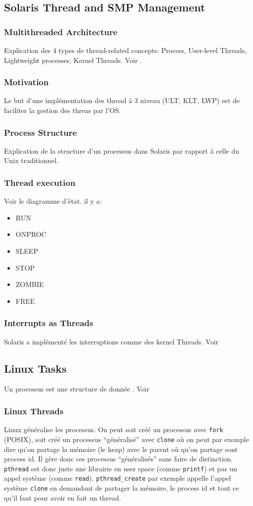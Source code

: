 \subsection{Solaris Thread and SMP Management }
\subsubsection{Multithreaded Architecture}
Explication des 4 types de thread-related concepts: Process, User-level Threads, Lightweight processes, Kernel Threads.
Voir \cite[p.~202]{stallings}.
\subsubsection{Motivation}
Le but d'une implémentation des thread à 3 niveau (ULT, KLT, LWP) est de faciliter la gestion des threas par l'OS.
\subsubsection{Process Structure}
Explication de la structure d'un processus dans Solaris par rapport à celle du Unix traditionnel.
\subsubsection{Thread execution}
Voir le diagramme d'état.
il y a:
\begin{itemize}
  \item RUN
  \item ONPROC
  \item SLEEP
  \item STOP
  \item ZOMBIE
  \item FREE
\end{itemize}
\subsubsection{Interrupts as Threads}
Solaris a implémenté les interruptions comme des kernel Threads.
Voir \cite[p.~206]{stallings}

\subsection{Linux Tasks}
Un processus est une structure de donnée .
Voir \cite[p.~207]{stallings}

\subsubsection{Linux Threads}
Linux généralise les processus.
On peut soit créé un processus avec \lstinline|fork| (POSIX),
soit créé un processus ``généralisé'' avec \lstinline|clone| où on peut par exemple dire
qu'on partage la mémoire (le heap) avec le parent où qu'on partage sont process id.
Il gère donc ces processus ``généralisés'' sans faire de distinction.
\lstinline|pthread| est donc juste une librairie en user space (comme \lstinline|printf|)
et pas un appel système (comme \lstinline|read|).
\lstinline|pthread_create| par exemple appelle l'appel système \lstinline|clone|
en demandant de partager la mémoire, le process id et tout ce qu'il faut
pour avoir en fait un thread.

